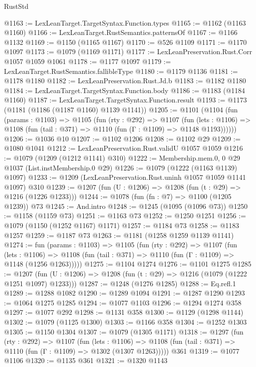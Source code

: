 \begin{lexlean}{RustStd}
\begin{coremodule}
@1163 := LexLeanTarget.TargetSyntax.Function.types
@1165 := @1162 (@1163 @1160)
@1166 := LexLeanTarget.RustSemantics.patternsOf
@1167 := @1166 @1132
@1169 := @1150 (@1165 @1167)
@1170 := @526 @1109
@1171 := @1170 @1097
@1173 := @1079 (@1169 @1171)
@1177 := LexLeanPreservation.Rust.Corr @1057 @1059 @1061
@1178 := @1177 @1097
@1179 := LexLeanTarget.RustSemantics.fallibleType
@1180 := @1179 @1136
@1181 := @1178 @1180
@1182 := LexLeanPreservation.Rust.Jd.b
@1183 := @1182 @1180
@1184 := LexLeanTarget.TargetSyntax.Function.body
@1186 := @1183 (@1184 @1160)
@1187 := LexLeanTarget.TargetSyntax.Function.result
@1193 := @1173 (@1181 (@1186 (@1187 @1160) @1139 @1141))
@1205 := @1101
    (@1104
      (fun (params : @1103) =>
      @1105
        (fun (rty : @292) =>
        @1107
          (fun (lets : @1106) =>
          @1108 (fun (tail : @371) => @1110 (fun (Γ : @1109) => @1148 @1193))))))
@1206 := @1036 @10
@1207 := @1102 @1206
@1208 := @1102 @29
@1209 := @1080 @1041
@1212 := LexLeanPreservation.Rust.validU @1057 @1059
@1216 := @1079 (@1209 (@1212 @1141) @310)
@1222 := Membership.mem.{0, 0} @29 @1037 (List.instMembership.{0} @29)
@1226 := @1079 (@1222 (@1163 @1139) @1097)
@1233 := @1209 (LexLeanPreservation.Rust.uninh @1057 @1059 @1141 @1097) @310
@1239 := @1207 (fun (U : @1206) => @1208 (fun (t : @29) => @1216 (@1226 @1233)))
@1244 := @1078 (fun (fn : @7) => @1100 (@1205 @1239)) @73
@1245 := And.intro
@1248 := @1245 (@1095 (@1096 @73))
@1250 := @1158 (@1159 @73)
@1251 := @1163 @73
@1252 := @1250 @1251
@1256 := @1079 (@1150 (@1252 @1167) @1171)
@1257 := @1184 @73
@1258 := @1183 @1257
@1259 := @1187 @73
@1263 := @1181 (@1258 @1259 @1139 @1141)
@1274 := fun (params : @1103) =>
  @1105
    (fun (rty : @292) =>
    @1107
      (fun (lets : @1106) =>
      @1108 (fun (tail : @371) => @1110 (fun (Γ : @1109) => @1148 (@1256 @1263)))))
@1275 := @1104 @1274
@1276 := @1101 @1275
@1285 := @1207 (fun (U : @1206) => @1208 (fun (t : @29) => @1216 (@1079 (@1222 @1251 @1097) @1233)))
@1287 := @1248 (@1276 @1285)
@1288 := Eq.refl.{1}
@1289 := @1288 @1082
@1290 := @1289 @1094
@1291 := @1287 @1290
@1293 := @1064 @1275 @1285
@1294 := @1077 @1103
@1296 := @1294 @1274 @358
@1297 := @1077 @292
@1298 := @1131 @358
@1300 := @1129 (@1298 @1144)
@1302 := @1079 (@1125 @1300)
@1303 := @1166 @358
@1304 := @1252 @1303
@1305 := @1150 @1304
@1307 := @1079 (@1305 @1171)
@1318 := @1297
    (fun (rty : @292) =>
    @1107
      (fun (lets : @1106) =>
      @1108 (fun (tail : @371) => @1110 (fun (Γ : @1109) => @1302 (@1307 @1263)))))
    @361
@1319 := @1077 @1106
@1320 := @1135 @361
@1321 := @1320 @1143

\end{coremodule}
\end{lexlean}

